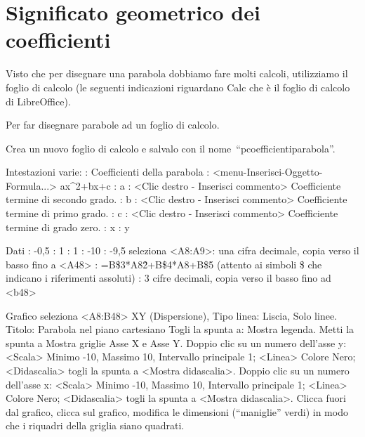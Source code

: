 \section{Significato geometrico dei coefficienti}
\label{sec:parabola_coefficienti}

Visto che per disegnare una parabola dobbiamo fare molti calcoli, utilizziamo 
il foglio di calcolo (le seguenti indicazioni riguardano Calc che è il foglio
di calcolo di LibreOffice).

\begin{procedura}
 Per far disegnare parabole ad un foglio di calcolo.
 \begin{enumerate*}
  \item Crea un nuovo foglio di calcolo e salvalo con il 
   nome~``pcoefficientiparabola''.
  \item Intestazioni varie:
   : Coefficienti della parabola
   : <menu-Inserisci-Oggetto-Formula...> ax\^{}2+bx+c
   : a
   : <Clic destro - Inserisci commento> Coefficiente termine di 
    secondo grado.
   : b
   : <Clic destro - Inserisci commento> Coefficiente termine di 
    primo grado.
   : c
   : <Clic destro - Inserisci commento> Coefficiente termine di 
    grado zero.
   : x
   : y
  \item Dati
   : -0,5
   : 1
   : 1
   : -10
   : -9,5
   \subitem seleziona <A8:A9>: una cifra decimale, 
    copia verso il basso fino a <A48>
   : =B\$3*A8\^2+B\$4*A8+B\$5 (attento ai simboli \$ che indicano i
    riferimenti assoluti)
   : 3 cifre decimali, copia verso il basso fino ad <b48>
  \item Grafico
   \subitem seleziona <A8:B48>
   \subitem XY (Dispersione), Tipo linea: Liscia, Solo linee.
   \subitem Titolo: Parabola nel piano cartesiano
   \subitem Togli la spunta a: Mostra legenda.
   \subitem Metti la spunta a Mostra griglie Asse X e Asse Y.
   \subitem Doppio clic su un numero dell'asse y: 
    <Scala> Minimo -10, Massimo 10, Intervallo principale 1;
    <Linea> Colore Nero;
    <Didascalia> togli la spunta a <Mostra didascalia>.
   \subitem Doppio clic su un numero dell'asse x: 
    <Scala> Minimo -10, Massimo 10, Intervallo principale 1;
    <Linea> Colore Nero;
    <Didascalia> togli la spunta a <Mostra didascalia>.
   \subitem Clicca fuori dal grafico, clicca sul grafico, modifica le 
    dimensioni (``maniglie'' verdi) in modo che i riquadri della griglia 
    siano quadrati.
 \end{enumerate*}
\end{procedura}

